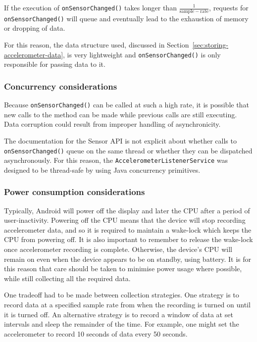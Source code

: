         If the execution of \texttt{onSensorChanged()} takes longer than $\frac{1}{\mathrm{sample-rate}}$, requests for \texttt{onSensorChanged()} will queue and eventually lead to the exhaustion of memory or dropping of data.
        
        For this reason, the data structure used, discussed in Section~\ref{sec:storing-accelerometer-data}, is very lightweight and \texttt{onSensorChanged()} is only responsible for passing data to it.
      
      \subsubsection{Concurrency considerations}
        Because \texttt{onSensorChanged()} can be called at such a high rate, it is possible that new calls to the method can be made while previous calls are still executing. Data corruption could result from improper handling of asynchronicity.
      
        The documentation for the Sensor API is not explicit about whether calls to \texttt{onSensorChanged()} queue on the same thread or whether they can be dispatched asynchronously. For this reason, the \texttt{AccelerometerListenerService} was designed to be thread-safe by using Java concurrency primitives.
      
      \subsubsection{Power consumption considerations}
        Typically, Android will power off the display and later the CPU after a period of user-inactivity. Powering off the CPU means that the device will stop recording accelerometer data, and so it is required to maintain a wake-lock which keeps the CPU from powering off. It is also important to remember to release the wake-lock once accelerometer recording is complete. Otherwise, the device's CPU will remain on even when the device appears to be on standby, using battery. It is for this reason that care should be taken to minimise power usage where possible, while still collecting all the required data.
        
        One tradeoff had to be made between collection strategies. One strategy is to record data at a specified sample rate from when the recording is turned on until it is turned off. An alternative strategy is to record a window of data at set intervals and sleep the remainder of the time. For example, one might set the accelerometer to record 10 seconds of data every 50 seconds.
        
